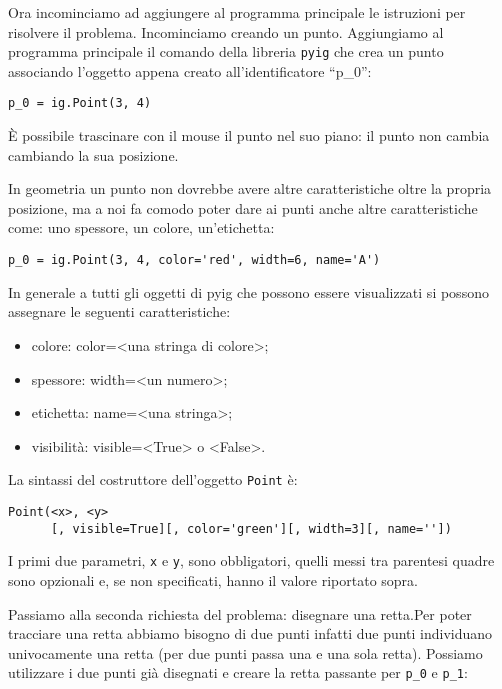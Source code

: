 Ora incominciamo ad aggiungere al programma principale le istruzioni per
risolvere il problema. Incominciamo creando un punto.
Aggiungiamo al programma principale il comando della libreria \texttt{pyig}  che
crea un punto associando l'oggetto appena creato all'identificatore ``p\_0'':

\begin{lstlisting}
p_0 = ig.Point(3, 4)
\end{lstlisting}

È possibile trascinare con il mouse il punto nel suo piano: il punto non cambia
cambiando la sua posizione.

In geometria un punto non dovrebbe avere altre caratteristiche oltre la propria
posizione, ma a noi fa comodo poter dare ai punti anche altre caratteristiche
come: uno spessore, un colore, un'etichetta:

\begin{lstlisting}
p_0 = ig.Point(3, 4, color='red', width=6, name='A')
\end{lstlisting}

In generale a tutti gli oggetti di pyig che possono essere visualizzati si
possono assegnare le seguenti caratteristiche:

\begin{itemize} [noitemsep]
\item colore: color=\textless{}una stringa di colore\textgreater{};
\item spessore: width=\textless{}un numero\textgreater{};
\item etichetta: name=\textless{}una stringa\textgreater{};
\item visibilità: visible=\textless{}True\textgreater{} o 
\textless{}False\textgreater{}.
\end{itemize}

La sintassi del costruttore dell'oggetto \texttt{Point} è:

\begin{lstlisting}
Point(<x>, <y>
      [, visible=True][, color='green'][, width=3][, name=''])
\end{lstlisting}

I primi due parametri, \texttt{x} e \texttt{y}, sono obbligatori, quelli messi 
tra parentesi quadre sono opzionali e, se non specificati, hanno il valore
riportato sopra.

Passiamo alla seconda richiesta del problema: disegnare una retta.Per poter
tracciare una retta abbiamo bisogno di due punti infatti due punti individuano
univocamente una retta (per due punti passa una e una sola retta).
Possiamo utilizzare i due punti già disegnati e creare la retta passante per
\texttt{p\_0} e \texttt{p\_1}:

